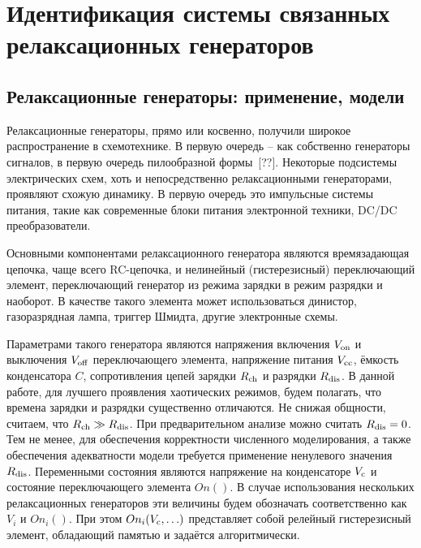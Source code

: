 \chapter{Идентификация системы связанных релаксационных генераторов}

\newcommand{\RelaxBjtIi}{системы из трёх связанных релаксационных генераторов на паре комплиментарных транзисторов}
\newcommand{\RelaxShIi}{системы из трёх связанных релаксационных генераторов на основе триггеров Шмидта}

\section{Релаксационные генераторы: применение, модели}


Релаксационные генераторы, прямо или косвенно, получили широкое распространение
в схемотехнике. В первую очередь -- как собственно генераторы
сигналов, в первую очередь пилообразной формы~[??].
Некоторые подсистемы электрических схем, хоть и непосредственно
релаксационными генераторами, проявляют схожую динамику.
В первую очередь это импульсные системы питания, такие как
современные блоки питания электронной техники, DC/DC преобразователи.

Основными компонентами релаксационного генератора являются
времязадающая цепочка, чаще всего RC-цепочка,
и нелинейный (гистерезисный) переключающий элемент,
переключающий генератор из режима зарядки в режим разрядки и наоборот.
В качестве такого элемента может использоваться
динистор, газоразрядная лампа, триггер Шмидта,
другие электронные схемы.


Параметрами такого генератора являются
напряжения включения $V_\mathrm{on}$ и выключения $V_\mathrm{off}$
переключающего элемента,
напряжение питания $V_\mathrm{cc}$,
ёмкость конденсатора $C$,
сопротивления цепей зарядки $R_\mathrm{ch}$
и разрядки $R_\mathrm{dis}$.
В данной работе, для лучшего проявления
хаотических режимов,
будем полагать, что времена зарядки и разрядки существенно отличаются.
Не снижая общности, считаем, что $R_\mathrm{ch} \gg R_\mathrm{dis} $.
При предварительном анализе можно считать $R_\mathrm{dis} = 0$.
Тем не менее, для обеспечения корректности численного моделирования,
а также обеспечения адекватности модели требуется применение ненулевого значения $R_\mathrm{dis}$.
Переменными состояния являются напряжение на конденсаторе $V_\mathrm{c}$
и состояние переключающего элемента $On()$.
В случае использования нескольких релаксационных генераторов
эти величины будем обозначать соответственно как
$V_{i}$ и $ On_{i}()$.
При этом  $ On_{i}( V_\mathrm{c}, \ldots )$ представляет собой
релейный гистерезисный элемент, обладающий памятью и задаётся алгоритмически.

